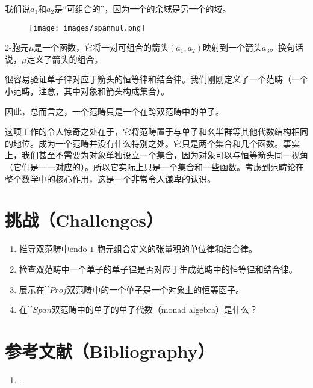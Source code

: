 我们说$a_1$和$a_2$是“可组合的”，因为一个的余域是另一个的域。

\begin{figure}[H]
  \centering
  \texttt{[image: images/spanmul.png]}
\end{figure}

\noindent
$2$-胞元$\mu$是一个函数，它将一对可组合的箭头$(a_1, a_2)$映射到一个箭头$a_3$。换句话说，$\mu$定义了箭头的组合。

很容易验证单子律对应于箭头的恒等律和结合律。我们刚刚定义了一个范畴（一个小范畴，注意，其中对象和箭头构成集合）。

因此，总而言之，一个范畴只是一个在跨双范畴中的单子。

这项工作的令人惊奇之处在于，它将范畴置于与单子和幺半群等其他代数结构相同的地位。成为一个范畴并没有什么特别之处。它只是两个集合和几个函数。事实上，我们甚至不需要为对象单独设立一个集合，因为对象可以与恒等箭头同一视角（它们是一一对应的）。所以它实际上只是一个集合和一些函数。考虑到范畴论在整个数学中的核心作用，这是一个非常令人谦卑的认识。

\section{挑战（Challenges）}

\begin{enumerate}
  \tightlist
  \item
  推导双范畴中endo-$1$-胞元组合定义的张量积的单位律和结合律。
  \item
  检查双范畴中一个单子的单子律是否对应于生成范畴中的恒等律和结合律。
  \item
  展示在$\cat{Prof}$双范畴中的一个单子是一个对象上的恒等函子。
  \item
  在$\cat{Span}$双范畴中的单子的单子代数（monad algebra）是什么？
\end{enumerate}

\section{参考文献（Bibliography）}
\begin{enumerate}
  \tightlist
  \item
  .
\end{enumerate}
